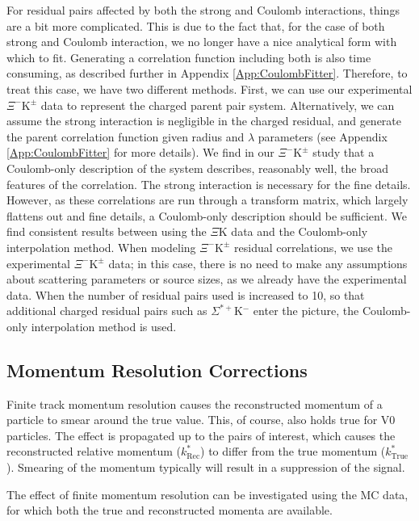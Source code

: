 \documentclass[ALICE,manyauthors]{cernphprep}
\newcommand{\ktrue}{$k^{*}_{\mathrm{True}}$\xspace}
\newcommand{\krec}{$k^{*}_{\mathrm{Rec}}$\xspace}
\newcommand{\XiKpm}{$\Xi^{-}\mathrm{K^{\pm}}$\xspace}
\begin{document}
For residual pairs affected by both the strong and Coulomb interactions, things are a bit more complicated.
This is due to the fact that, for the case of both strong and Coulomb interaction, we no longer have a nice analytical form with which to fit.
Generating a correlation function including both is also time consuming, as described further in Appendix \ref{App:CoulombFitter}.
Therefore, to treat this case, we have two different methods.
First, we can use our experimental \XiKpm data to represent the charged parent pair system.  
Alternatively, we can assume the strong interaction is negligible in the charged residual, and generate the parent correlation function given radius and $\lambda$ parameters (see Appendix \ref{App:CoulombFitter} for more details).  
We find in our \XiKpm study that a Coulomb-only description of the system describes, reasonably well, the broad features of the correlation.  
The strong interaction is necessary for the fine details.  
However, as these correlations are run through a transform matrix, which largely flattens out and fine details, a Coulomb-only description should be sufficient.  
We find consistent results between using the $\Xi$K data and the Coulomb-only interpolation method. 
When modeling \XiKpm residual correlations, we use the experimental \XiKpm data; in this case, there is no need to make any assumptions about scattering parameters or source sizes, as we already have the experimental data.  
When the number of residual pairs used is increased to 10, so that additional charged residual pairs such as $\Sigma^{*+}$K$^{-}$ enter the picture, the Coulomb-only interpolation method is used.


\subsection{Momentum Resolution Corrections}
\label{MomentumResolutionCorrections}

Finite track momentum resolution causes the reconstructed momentum of a particle to smear around the true value.
This, of course, also holds true for V0 particles.
The effect is propagated up to the pairs of interest, which causes the reconstructed relative momentum (\krec) to differ from the true momentum (\ktrue).
Smearing of the momentum typically will result in a suppression of the signal.

The effect of finite momentum resolution can be investigated using the MC data, for which both the true and reconstructed momenta are available.
\end{document}
